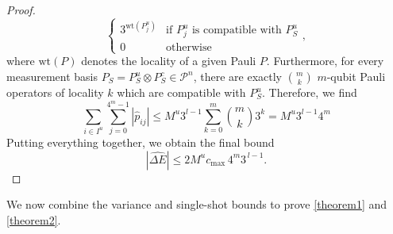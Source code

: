 \begin{proof}
\begin{equation}
\begin{cases}
            3^{\mathrm{wt}(P^u_j)}&\text{if $P^u_j$ is compatible with $P_S^u$}\\
            0&\text{otherwise}
        \end{cases},
    \end{equation}
    where $\mathrm{wt}(P)$ denotes the locality of a given Pauli $P$. Furthermore, for every measurement basis $P_S=P^u_S\otimes P^c_S\in \mathcal{P}^n$, there are exactly $\binom{m}{k}$ $m$-qubit Pauli operators of locality $k$ which are compatible with $P^u_S$. Therefore, we find
    \begin{equation}
        \sum_{i\in I^u}\sum_{j=0}^{4^m-1}|\hat p_{ij}|\leq M^u3^{l-1}\sum^m_{k=0}\binom{m}{k}3^k=M^u3^{l-1}4^m
    \end{equation}
    Putting everything together, we obtain the final bound
    \begin{equation}
        \left|\hat{\Delta E}\right|\leq2 M^u c_{\max} \, 4^{m} 3^{\,l-1}.
    \end{equation}
\end{proof}
We now combine the variance and single-shot bounds to prove \cref{theorem1} and \cref{theorem2}.

